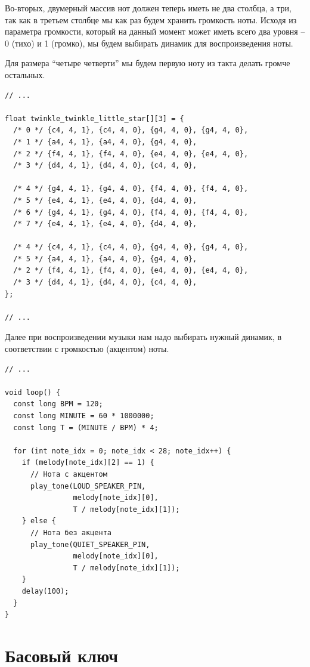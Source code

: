 \documentclass[a4paper,twoside]{book}
\begin{document}
Во-вторых, двумерный массив нот должен теперь иметь не два столбца, а три, так
как в третьем столбце мы как раз будем хранить громкость ноты.  Исходя из
параметра громкости, который на данный момент может иметь всего два уровня -- 0
(тихо) и 1 (громко), мы будем выбирать динамик для воспроизведения ноты.

Для размера ``четыре четверти'' мы будем первую ноту из такта делать громче
остальных.

\begin{verbatim}
// ...

float twinkle_twinkle_little_star[][3] = {
  /* 0 */ {c4, 4, 1}, {c4, 4, 0}, {g4, 4, 0}, {g4, 4, 0},
  /* 1 */ {a4, 4, 1}, {a4, 4, 0}, {g4, 4, 0},
  /* 2 */ {f4, 4, 1}, {f4, 4, 0}, {e4, 4, 0}, {e4, 4, 0},
  /* 3 */ {d4, 4, 1}, {d4, 4, 0}, {c4, 4, 0},

  /* 4 */ {g4, 4, 1}, {g4, 4, 0}, {f4, 4, 0}, {f4, 4, 0},
  /* 5 */ {e4, 4, 1}, {e4, 4, 0}, {d4, 4, 0},
  /* 6 */ {g4, 4, 1}, {g4, 4, 0}, {f4, 4, 0}, {f4, 4, 0},
  /* 7 */ {e4, 4, 1}, {e4, 4, 0}, {d4, 4, 0},

  /* 4 */ {c4, 4, 1}, {c4, 4, 0}, {g4, 4, 0}, {g4, 4, 0},
  /* 5 */ {a4, 4, 1}, {a4, 4, 0}, {g4, 4, 0},
  /* 2 */ {f4, 4, 1}, {f4, 4, 0}, {e4, 4, 0}, {e4, 4, 0},
  /* 3 */ {d4, 4, 1}, {d4, 4, 0}, {c4, 4, 0},
};

// ...
\end{verbatim}

Далее при воспроизведении музыки нам надо выбирать нужный динамик, в
соответствии с громкостью (акцентом) ноты.

\begin{verbatim}
// ...

void loop() {
  const long BPM = 120;
  const long MINUTE = 60 * 1000000;
  const long T = (MINUTE / BPM) * 4;

  for (int note_idx = 0; note_idx < 28; note_idx++) {
    if (melody[note_idx][2] == 1) {
      // Нота с акцентом
      play_tone(LOUD_SPEAKER_PIN,
                melody[note_idx][0],
                T / melody[note_idx][1]);
    } else {
      // Нота без акцента
      play_tone(QUIET_SPEAKER_PIN,
                melody[note_idx][0],
                T / melody[note_idx][1]);
    }
    delay(100);
  }
}
\end{verbatim}

\section{Басовый ключ}
\end{document}
